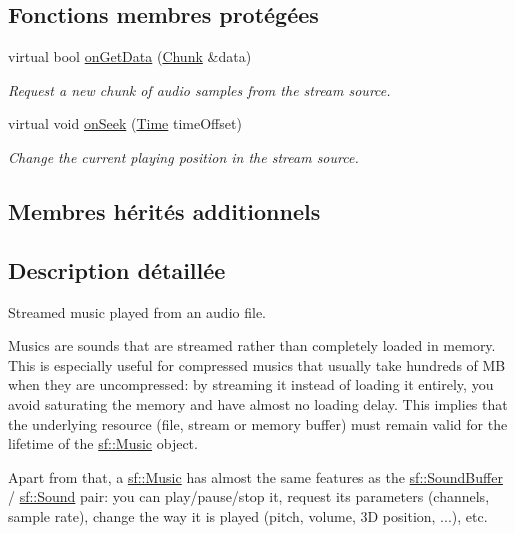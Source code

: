 \subsection*{Fonctions membres protégées}
\begin{DoxyCompactItemize}
\item 
virtual bool \hyperlink{classsf_1_1Music_aca1bcb4e5d56a854133e74bd86374463}{on\+Get\+Data} (\hyperlink{structsf_1_1SoundStream_1_1Chunk}{Chunk} \&data)
\begin{DoxyCompactList}\small\item\em Request a new chunk of audio samples from the stream source. \end{DoxyCompactList}\item 
virtual void \hyperlink{classsf_1_1Music_a15119cc0419c16bb334fa0698699c02e}{on\+Seek} (\hyperlink{classsf_1_1Time}{Time} time\+Offset)
\begin{DoxyCompactList}\small\item\em Change the current playing position in the stream source. \end{DoxyCompactList}\end{DoxyCompactItemize}
\subsection*{Membres hérités additionnels}


\subsection{Description détaillée}
Streamed music played from an audio file. 

Musics are sounds that are streamed rather than completely loaded in memory. This is especially useful for compressed musics that usually take hundreds of MB when they are uncompressed\+: by streaming it instead of loading it entirely, you avoid saturating the memory and have almost no loading delay. This implies that the underlying resource (file, stream or memory buffer) must remain valid for the lifetime of the \hyperlink{classsf_1_1Music}{sf\+::\+Music} object.

Apart from that, a \hyperlink{classsf_1_1Music}{sf\+::\+Music} has almost the same features as the \hyperlink{classsf_1_1SoundBuffer}{sf\+::\+Sound\+Buffer} / \hyperlink{classsf_1_1Sound}{sf\+::\+Sound} pair\+: you can play/pause/stop it, request its parameters (channels, sample rate), change the way it is played (pitch, volume, 3D position, ...), etc.

